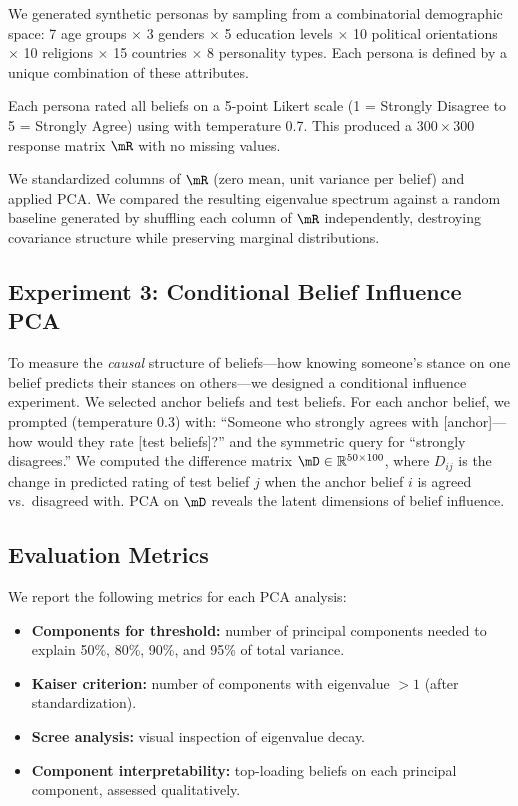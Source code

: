 We generated \npersonas synthetic personas by sampling from a combinatorial demographic space: 7 age groups $\times$ 3 genders $\times$ 5 education levels $\times$ 10 political orientations $\times$ 10 religions $\times$ 15 countries $\times$ 8 personality types. Each persona is defined by a unique combination of these attributes.

Each persona rated all \nbeliefsub beliefs on a 5-point Likert scale (1 = Strongly Disagree to 5 = Strongly Agree) using \gptmini with temperature 0.7. This produced a $300 \times 300$ response matrix $\mR$ with no missing values.

We standardized columns of $\mR$ (zero mean, unit variance per belief) and applied PCA. We compared the resulting eigenvalue spectrum against a random baseline generated by shuffling each column of $\mR$ independently, destroying covariance structure while preserving marginal distributions.

\subsection{Experiment 3: Conditional Belief Influence PCA}
\label{sec:conditional_pca}

To measure the {\em causal} structure of beliefs---how knowing someone's stance on one belief predicts their stances on others---we designed a conditional influence experiment. We selected \nanchors anchor beliefs and \ntestbeliefs test beliefs. For each anchor belief, we prompted \gptmini (temperature 0.3) with: ``Someone who strongly agrees with [anchor]---how would they rate [test beliefs]?'' and the symmetric query for ``strongly disagrees.'' We computed the difference matrix $\mD \in \mathbb{R}^{50 \times 100}$, where $D_{ij}$ is the change in predicted rating of test belief $j$ when the anchor belief $i$ is agreed vs.\ disagreed with. PCA on $\mD$ reveals the latent dimensions of belief influence.

\subsection{Evaluation Metrics}

We report the following metrics for each PCA analysis:
\begin{itemize}[leftmargin=*,itemsep=0pt,topsep=0pt]
    \item {\bf Components for threshold:} number of principal components needed to explain 50\%, 80\%, 90\%, and 95\% of total variance.
    \item {\bf Kaiser criterion:} number of components with eigenvalue $> 1$ (after standardization).
    \item {\bf Scree analysis:} visual inspection of eigenvalue decay.
    \item {\bf Component interpretability:} top-loading beliefs on each principal component, assessed qualitatively.
\end{itemize}

